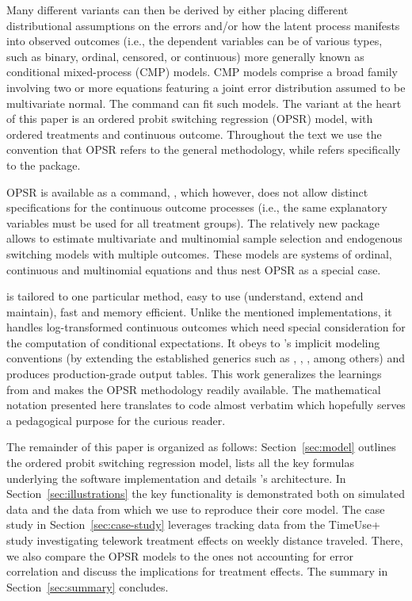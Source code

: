\documentclass[%
    twoside, openright, titlepage, numbers=noenddot,%
    cleardoublepage=empty,%
    abstract=false,%
    BCOR=5.5mm, paper=a5, fontsize=10pt,%
]{scrreprt}
\begin{document}
Many different variants can then be derived by either placing different distributional assumptions on the errors and/or how the latent process manifests into observed outcomes (i.e., the dependent variables can be of various types, such as binary, ordinal, censored, or continuous) more generally known as conditional mixed-process (CMP) models. CMP models comprise a broad family involving two or more equations featuring a joint error distribution assumed to be multivariate normal. The  \citep{Stata} command  \citep{Roodman:2011} can fit such models. The variant at the heart of this paper is an ordered probit switching regression (OPSR) model, with ordered treatments and continuous outcome. Throughout the text we use the convention that OPSR refers to the general methodology, while  refers specifically to the package.

OPSR is available as a  command,  \citep{Chiburis+Lokshin:2007}, which however, does not allow distinct specifications for the continuous outcome processes (i.e., the same explanatory variables must be used for all treatment groups). The relatively new  package  \citep{Potanin:2024} allows to estimate multivariate and multinomial sample selection and endogenous switching models with multiple outcomes. These models are systems of ordinal, continuous and multinomial equations and thus nest OPSR as a special case.

 is tailored to one particular method, easy to use (understand, extend and maintain), fast and memory efficient. Unlike the mentioned implementations, it handles log-transformed continuous outcomes which need special consideration for the computation of conditional expectations. It obeys to 's implicit modeling conventions (by extending the established generics such as , , ,  among others) and produces production-grade output tables. This work generalizes the learnings from \cite{Wang+Mokhtarian:2024} and makes the OPSR methodology readily available. The mathematical notation presented here translates to code almost verbatim which hopefully serves a pedagogical purpose for the curious reader.

The remainder of this paper is organized as follows: Section~\ref{sec:model} outlines the ordered probit switching regression model, lists all the key formulas underlying the software implementation and details 's architecture. In Section~\ref{sec:illustrations} the key functionality is demonstrated both on simulated data and the data from \cite{Wang+Mokhtarian:2024} which we use to reproduce their core model. The case study in Section~\ref{sec:case-study} leverages tracking data from the TimeUse+ study \citep{Winkler+Meister+Axhausen:2024} investigating telework treatment effects on weekly distance traveled. There, we also compare the OPSR models to the ones not accounting for error correlation and discuss the implications for treatment effects. The summary in Section~\ref{sec:summary} concludes.
\end{document}
